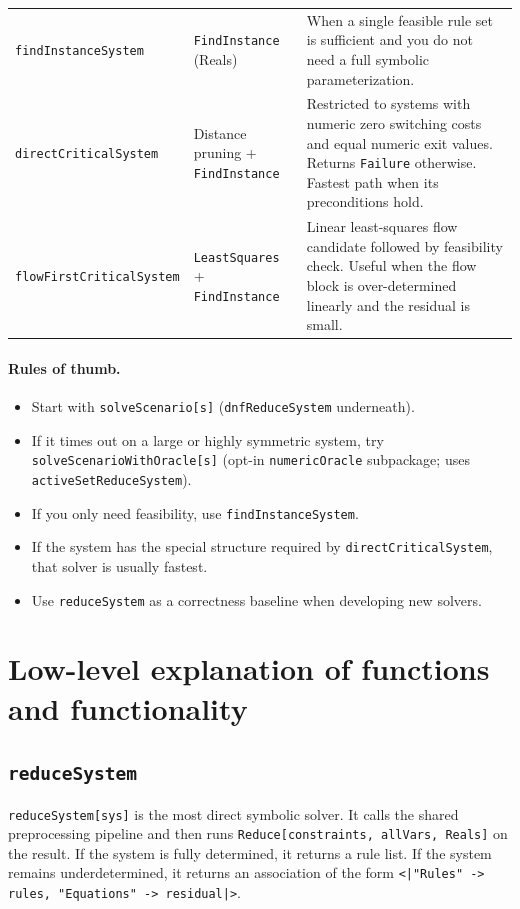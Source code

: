 \documentclass[11pt]{article}
\begin{document}
\begin{center}
\begin{longtable}{@{}p{4.0cm} p{3.2cm} p{8.0cm}@{}}
\texttt{findInstanceSystem} & \texttt{FindInstance} (Reals) & When a single feasible rule set is sufficient and you do not need a full symbolic parameterization. \\
\texttt{directCriticalSystem} & Distance pruning + \texttt{FindInstance} & Restricted to systems with numeric zero switching costs and equal numeric exit values. Returns \texttt{Failure} otherwise. Fastest path when its preconditions hold. \\
\texttt{flowFirstCriticalSystem} & \texttt{LeastSquares} + \texttt{FindInstance} & Linear least-squares flow candidate followed by feasibility check. Useful when the flow block is over-determined linearly and the residual is small. \\
\bottomrule
\end{longtable}
\end{center}

\paragraph{Rules of thumb.}
\begin{itemize}
\item Start with \texttt{solveScenario[s]} (\texttt{dnfReduceSystem} underneath).
\item If it times out on a large or highly symmetric system, try \texttt{solveScenarioWithOracle[s]} (opt-in \texttt{numericOracle} subpackage; uses \texttt{activeSetReduceSystem}).
\item If you only need feasibility, use \texttt{findInstanceSystem}.
\item If the system has the special structure required by \texttt{directCriticalSystem}, that solver is usually fastest.
\item Use \texttt{reduceSystem} as a correctness baseline when developing new solvers.
\end{itemize}

\section{Low-level explanation of functions and functionality}

\subsection*{\texttt{reduceSystem}}

\texttt{reduceSystem[sys]} is the most direct symbolic solver. It calls the shared preprocessing pipeline and then runs \texttt{Reduce[constraints, allVars, Reals]} on the result. If the system is fully determined, it returns a rule list. If the system remains underdetermined, it returns an association of the form \texttt{<|"Rules" -> rules, "Equations" -> residual|>}.
\end{document}
